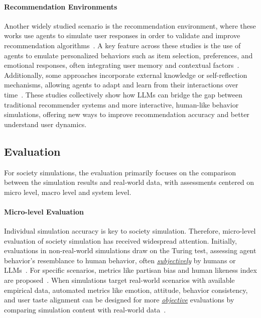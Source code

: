\paragraph{Recommendation Environments}
Another widely studied scenario is the recommendation environment, where these works use agents to simulate user responses in order to validate and improve recommendation algorithms~\cite{huang2023recommender,zhang2024prospect}. A key feature across these studies is the use of agents to emulate personalized behaviors such as item selection, preferences, and emotional responses, often integrating user memory and contextual factors~\cite{wang2023recagent,zhang2024agentcf,Zhang2024on}. Additionally, some approaches incorporate external knowledge or self-reflection mechanisms, allowing agents to adapt and learn from their interactions over time~\cite{wang2023recmind}. These studies collectively show how LLMs can bridge the gap between traditional recommender systems and more interactive, human-like behavior simulations, offering new ways to improve recommendation accuracy and better understand user dynamics.




\subsection{Evaluation}
\label{subsec:soc_eval}

For society simulations, the evaluation primarily focuses on the comparison between the simulation results and real-world data, with assessments centered on micro level, macro level and system level.

\paragraph{Micro-level Evaluation}
Individual simulation accuracy is key to society simulation. Therefore, micro-level evaluation of society simulation has received widespread attention. Initially, evaluations in non-real-world simulations draw on the Turing test, assessing agent behavior's resemblance to human behavior, often \textit{\underline{subjectively}} by humans or LLMs~\cite{park2023generative,liang2023leveraging,yu2024affordable}. For specific scenarios, metrics like partisan bias and human likeness index are proposed~\cite{chuang2024wisdom}. When simulations target real-world scenarios with available empirical data, automated metrics like emotion, attitude, behavior consistency, and user taste alignment can be designed for more \textit{\underline{objective}} evaluations by comparing simulation content with real-world data~\cite{gao2023s3,mou2024unveiling,Zhang2024on}.

